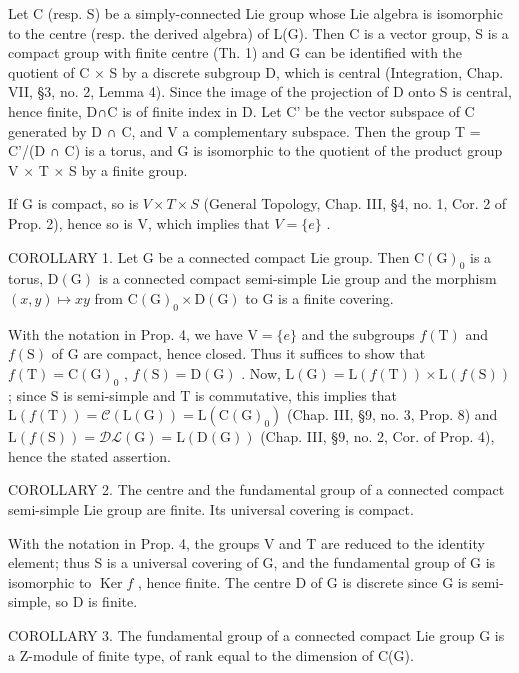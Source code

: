 Let C (resp. S) be a simply-connected Lie group whose Lie algebra is isomorphic to the centre (resp. the derived algebra) of L(G). Then C is a vector group, S is a compact group with finite centre (Th. 1) and G can be identified with the quotient of C × S by a discrete subgroup D, which is central (Integration, Chap. VII, §3, no. 2, Lemma 4). Since the image of the projection of D onto S is central, hence finite, D∩C is of finite index in D. Let C' be the vector subspace of C generated by D ∩ C, and V a complementary subspace. Then the group T = C'/(D ∩ C) is a torus, and G is isomorphic to the quotient of the product group V × T × S by a finite group.

If G is compact, so is \(V \times T \times S\) (General Topology, Chap. III, §4, no. 1, Cor. 2 of Prop. 2), hence so is V, which implies that \(V = \{e\}\) .

COROLLARY 1. Let G be a connected compact Lie group. Then \(\mathrm{C}(\mathrm{G})_{0}\) is a torus, \(\mathrm{D}(\mathrm{G})\) is a connected compact semi-simple Lie group and the morphism \((x,y)\mapsto xy\) from \(\mathrm{C}(\mathrm{G})_{0}\times\mathrm{D}(\mathrm{G})\) to G is a finite covering.

With the notation in Prop. 4, we have \(\mathrm{V} = \{e\}\) and the subgroups \(f(\mathrm{T})\) and \(f(\mathrm{S})\) of \(\mathrm{G}\) are compact, hence closed. Thus it suffices to show that \(f(\mathrm{T}) = \mathrm{C}(\mathrm{G})_0\) , \(f(\mathrm{S}) = \mathrm{D}(\mathrm{G})\) . Now, \(\mathrm{L}(\mathrm{G}) = \mathrm{L}(f(\mathrm{T})) \times \mathrm{L}(f(\mathrm{S}))\) ; since \(\mathrm{S}\) is semi-simple and \(\mathrm{T}\) is commutative, this implies that \(\mathrm{L}(f(\mathrm{T})) = \mathcal{C}(\mathrm{L}(\mathrm{G})) = \mathrm{L}(\mathrm{C}(\mathrm{G})_0)\) (Chap. III, §9, no. 3, Prop. 8) and \(\mathrm{L}(f(\mathrm{S})) = \mathcal{DL}(\mathrm{G}) = \mathrm{L}(\mathrm{D}(\mathrm{G}))\) (Chap. III, §9, no. 2, Cor. of Prop. 4), hence the stated assertion.

COROLLARY 2. The centre and the fundamental group of a connected compact semi-simple Lie group are finite. Its universal covering is compact.

With the notation in Prop. 4, the groups V and T are reduced to the identity element; thus S is a universal covering of G, and the fundamental group of G is isomorphic to \(\operatorname{Ker} f\) , hence finite. The centre D of G is discrete since G is semi-simple, so D is finite.

COROLLARY 3. The fundamental group of a connected compact Lie group G is a Z-module of finite type, of rank equal to the dimension of C(G).

